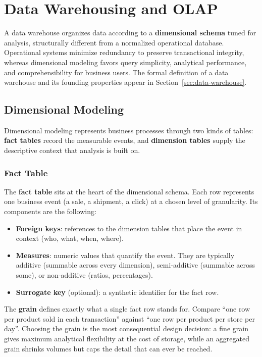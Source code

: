 
\section{Data Warehousing and OLAP}
\label{part:dw-olap}

A data warehouse organizes data according to a \textbf{dimensional schema} tuned for analysis, structurally different from a normalized operational database. Operational systems minimize redundancy to preserve transactional integrity, whereas dimensional modeling favors query simplicity, analytical performance, and comprehensibility for business users. The formal definition of a data warehouse and its founding properties appear in Section~\ref{sec:data-warehouse}.

\subsection{Dimensional Modeling}
\label{sec:dimensional-modeling}

Dimensional modeling represents business processes through two kinds of tables: \textbf{fact tables} record the measurable events, and \textbf{dimension tables} supply the descriptive context that analysis is built on.

\subsubsection{Fact Table}
\label{subsec:fact-table}

The \textbf{fact table} sits at the heart of the dimensional schema. Each row represents one business event (a sale, a shipment, a click) at a chosen level of granularity. Its components are the following:
\begin{itemize}
    \item \textbf{Foreign keys}: references to the dimension tables that place the event in context (who, what, when, where).
    \item \textbf{Measures}: numeric values that quantify the event. They are typically additive (summable across every dimension), semi-additive (summable across some), or non-additive (ratios, percentages).
    \item \textbf{Surrogate key} (optional): a synthetic identifier for the fact row.
\end{itemize}

The \textbf{grain} defines exactly what a single fact row stands for. Compare ``one row per product sold in each transaction'' against ``one row per product per store per day''. Choosing the grain is the most consequential design decision: a fine grain gives maximum analytical flexibility at the cost of storage, while an aggregated grain shrinks volumes but caps the detail that can ever be reached.

